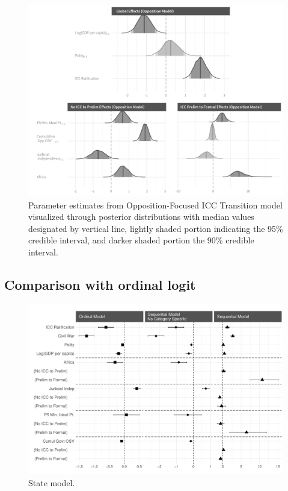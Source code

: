 \begin{figure}
    \centering
    \includegraphics[width=1\textwidth]{rebelCoefSumm_ptsCivilWarOnly.pdf}
    \caption{Parameter estimates from Opposition-Focused ICC Transition model visualized through posterior distributions with median values designated by vertical line, lightly shaded portion indicating the 95\% credible interval, and darker shaded portion the 90\% credible interval.}
    \label{fig:rebelModel}
\end{figure}

\subsection*{Comparison with ordinal logit}

\begin{figure}
    \centering
    \includegraphics[width=1\textwidth]{modCompare_state.pdf}
    \caption{State model.}
    \label{fig:stateCoefCompare}
\end{figure}


